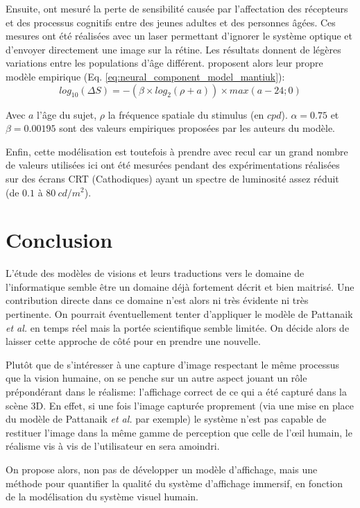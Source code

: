 	\par Ensuite, \citep{burton_aging_1993} ont mesuré la perte de sensibilité causée par l'affectation des récepteurs et des processus cognitifs entre des jeunes adultes et des personnes âgées. Ces mesures ont été réalisées avec un laser permettant d'ignorer le système optique et d'envoyer directement une image sur la rétine. Les résultats donnent de légères variations entre les populations d'âge différent. \citep{mantiuk_human_2015} proposent alors leur propre modèle empirique (Eq. \ref{eq:neural_component_model_mantiuk}):
	\begin{equation}
		log_{10}(\Delta S) = - (\beta \times log_2(\rho + a)) \times max(a-24;0)
		\label{eq:neural_component_model_mantiuk}
	\end{equation}
	
	\par Avec $a$ l'âge du sujet, $\rho$ la fréquence spatiale du stimulus (en $cpd$). $\alpha = 0.75$ et $\beta = 0.00195$ sont des valeurs empiriques proposées par les auteurs du modèle.
	
	\par Enfin, cette modélisation est toutefois à prendre avec recul car un grand nombre de valeurs utilisées ici ont été mesurées pendant des expérimentations réalisées sur des écrans CRT (Cathodiques) ayant un spectre de luminosité assez réduit (de $0.1$ à $80~cd/m^2$).
	
	\chapter*{Conclusion}
	\par L'étude des modèles de visions et leurs traductions vers le domaine de l'informatique semble être un domaine déjà fortement décrit et bien maitrisé. Une contribution directe dans ce domaine n'est alors ni très évidente ni très pertinente. On pourrait éventuellement tenter d'appliquer le modèle de Pattanaik \textit{et al.} en temps réel mais la portée scientifique semble limitée. On décide alors de laisser cette approche de côté pour en prendre une nouvelle.
	
	\par Plutôt que de s'intéresser à une capture d'image respectant le même processus que la vision humaine, on se penche sur un autre aspect jouant un rôle prépondérant dans le réalisme: l'affichage correct de ce qui a été capturé dans la scène 3D. En effet, si une fois l'image capturée proprement (via une mise en place du modèle de Pattanaik \textit{et al.} par exemple) le système n'est pas capable de restituer l'image dans la même gamme de perception que celle de l'œil humain, le réalisme vis à vis de l'utilisateur en sera amoindri.
	
	\par On propose alors, non pas de développer un modèle d'affichage, mais une méthode pour quantifier la qualité du système d'affichage immersif, en fonction de la modélisation du système visuel humain.